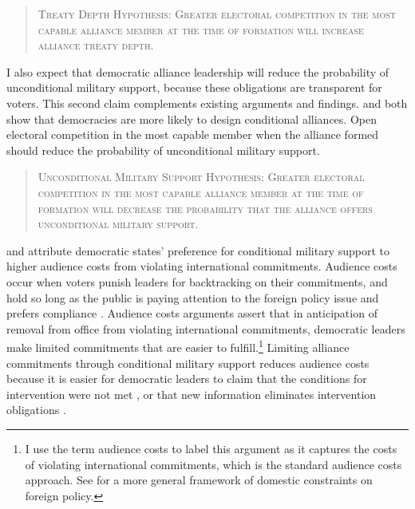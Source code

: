 \documentclass[12pt]{article}
\begin{document}
\begin{quote}
\textsc{Treaty Depth Hypothesis: Greater electoral competition in the most capable alliance member at the time of formation will increase alliance treaty depth.}
\end{quote}   


I also expect that democratic alliance leadership will reduce the probability of unconditional military support, because these obligations are transparent for voters. 
This second claim complements existing arguments and findings. 
\citet{Mattes2012} and \citet{Chibaetal2015} both show that democracies are more likely to design conditional alliances. 
Open electoral competition in the most capable member when the alliance formed should reduce the probability of unconditional military support.


\begin{quote}
\textsc{Unconditional Military Support Hypothesis: Greater electoral competition in the most capable alliance member at the time of formation will decrease the probability that the alliance offers unconditional military support.}
\end{quote} 


\citet{Mattes2012} and \citet{Chibaetal2015} attribute democratic states' preference for conditional military support to higher audience costs from violating international commitments. 
Audience costs occur when voters punish leaders for backtracking on their commitments, and hold so long as the public is paying attention to the foreign policy issue \citep{Slantchev2006, PotterBaum2014} and prefers compliance \citep{Chaudoin2014, KertzerBrutger2016}.  
Audience costs arguments assert that in anticipation of removal from office from violating international commitments, democratic leaders make limited commitments that are easier to fulfill.\footnote{I use the term audience costs to label this argument as it captures the costs of violating international commitments, which is the standard audience costs approach. See \citet{HydeSaunders2020} for a more general framework of domestic constraints on foreign policy.} 
Limiting alliance commitments through conditional military support reduces audience costs because it is easier for democratic leaders to claim that the conditions for intervention were not met \citep{FjelstulReiter2019}, or that new information eliminates intervention obligations \citep{LevenduskyHorowitz2012}. 
\end{document}
